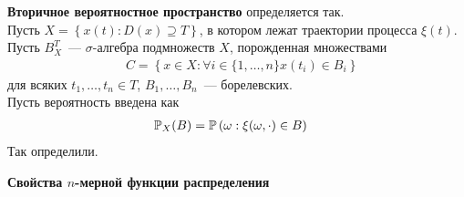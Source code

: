 \begin{Def}
    \textbf{Вторичное вероятностное пространство} определяется так.
    \\
    Пусть $X = \left\{ x(t) : D(x) \supseteq T \right\}$, в котором лежат
    траектории процесса $\xi(t)$.
    \\
    Пусть $B_X^T$~--- $\sigma$-алгебра подмножеств $X$, порожденная множествами
    \begin{align*}
      & C = \left\{ x \in X: \forall i \in \{1, \dots, n\} x(t_i) \in B_i \right\}
    \end{align*}
    для всяких $t_1, \dots, t_n \in T$, $B_1, \dots, B_n$~--- борелевских.
    \\
    Пусть вероятность введена как
    \begin{align*}
      & \mathbb{P}_X(B) = \mathbb{P}\left( \omega: \xi(\omega, \cdot) \in B \right)
    \end{align*}
    Так определили.
\end{Def}
\textbf{Свойства $n$-мерной функции распределения}
